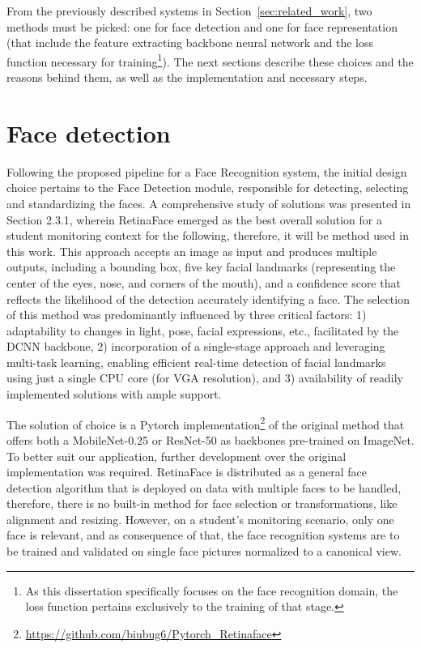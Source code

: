 \documentclass[class=report, crop=false, a4paper, 12pt]{standalone}
\begin{document}
\par From the previously described systems in Section~\ref{sec:related_work}, two methods must be picked: one for face detection and one for face representation (that include the feature extracting backbone neural network and the loss function necessary for training\footnote{As this dissertation specifically focuses on the face recognition domain, the loss function pertains exclusively to the training of that stage.}). The next sections describe these choices and the reasons behind them, as well as the implementation and necessary steps.

\section{Face detection}
\par Following the proposed pipeline for a Face Recognition system, the initial design choice pertains to the Face Detection module, responsible for detecting, selecting and standardizing the faces. A comprehensive study of solutions was presented in Section 2.3.1, wherein RetinaFace emerged as the best overall solution for a student monitoring context for the following, therefore, it will be method used in this work. This approach accepts an image as input and produces multiple outputs, including a bounding box, five key facial landmarks (representing the center of the eyes, nose, and corners of the mouth), and a confidence score that reflects the likelihood of the detection accurately identifying a face. The selection of this method was predominantly influenced by three critical factors: 1) adaptability to changes in light, pose, facial expressions, etc., facilitated by the DCNN backbone, 2) incorporation of a single-stage approach and leveraging multi-task learning, enabling efficient real-time detection of facial landmarks using just a single CPU core (for VGA resolution), and 3) availability of readily implemented solutions with ample support.

\par The solution of choice is a Pytorch implementation\footnote{\url{https://github.com/biubug6/Pytorch_Retinaface}} of the original method that offers both a MobileNet-0.25 or ResNet-50 as backbones pre-trained on ImageNet. To better suit our application, further development over the original implementation was required. RetinaFace is distributed as a general face detection algorithm that is deployed on data with multiple faces to be handled, therefore, there is no built-in method for face selection or transformations, like alignment and resizing. However, on a student's monitoring scenario, only one face is relevant, and as consequence of that, the face recognition systems are to be trained and validated on single face pictures normalized to a canonical view.
\end{document}
